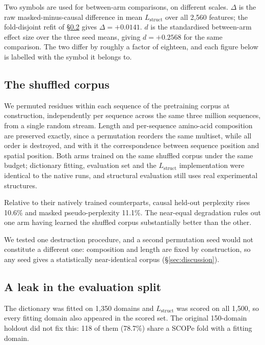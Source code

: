 \documentclass{article} %
\newcommand{\red}[1]{\textcolor{red}{#1}}
\newcommand{\opentag}[1]{\textcolor{red}{\textsuperscript{[\ref{#1}]}}}
\newcommand{\pend}[2]{\red{#1}\opentag{#2}}
\renewcommand{\red}[1]{#1}
\renewcommand{\opentag}[1]{}
\renewcommand{\pend}[2]{#1}
\newcommand{\Lstruct}{\ensuremath{L_{\mathrm{struct}}}}
\begin{document}
Two symbols are used for between-arm comparisons, on different scales. $\Delta$ is the raw
masked-minus-causal difference in mean \Lstruct{} over all 2{,}560 features; the fold-disjoint
refit of \S\ref{sec:leak} gives $\Delta = +0.0141$. $d$ is the standardised between-arm effect
size over the three seed means, giving $d = +0.2568$ for the same comparison. The two differ by
roughly a factor of eighteen, and each figure below is labelled with the symbol it belongs to.

\subsection{The shuffled corpus}
\label{sec:shuffled}

We permuted residues within each sequence of the pretraining corpus at construction, independently
per sequence across the same three million sequences, from a single random stream. Length and
per-sequence amino-acid composition are preserved exactly, since a permutation reorders the same
multiset, while all order is destroyed, and with it the correspondence between sequence position
and spatial position. Both arms trained on the same shuffled corpus under the same budget;
dictionary fitting, evaluation set and the \Lstruct{} implementation were identical to the native
runs, and structural evaluation still uses real experimental structures.

Relative to their natively trained counterparts, causal held-out perplexity rises 10.6\% and
masked pseudo-perplexity 11.1\%. The near-equal degradation rules out one arm having learned the
shuffled corpus substantially better than the other.

We tested one destruction procedure, and a second permutation seed would not constitute a
different one: composition and length are fixed by construction, so any seed gives a statistically
near-identical corpus \pend{(\S\ref{sec:discussion})}{t:blockshuffle}.

\subsection{A leak in the evaluation split}
\label{sec:leak}

The dictionary was fitted on 1{,}350 domains and \Lstruct{} was scored on all 1{,}500, so every
fitting domain also appeared in the scored set. The original 150-domain holdout did not fix this:
118 of them (78.7\%) share a SCOPe fold with a fitting domain.
\end{document}

